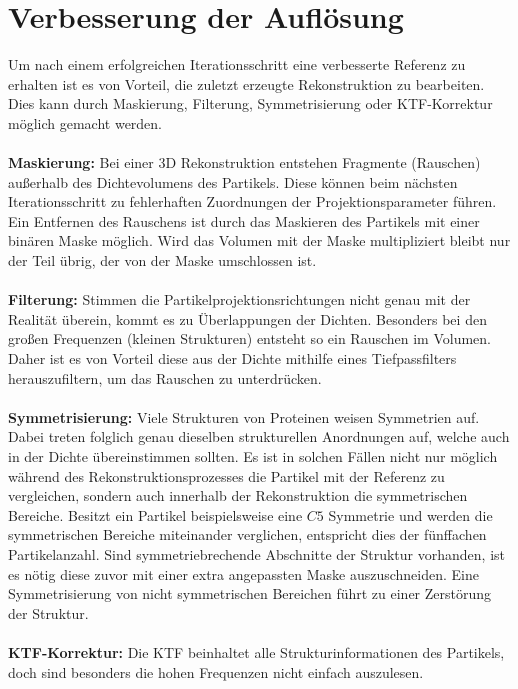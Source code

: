 \section{Verbesserung der Auflösung} %
\label{sec:verbesserung_der_aufloesung}

Um nach einem erfolgreichen Iterationsschritt eine verbesserte Referenz zu erhalten ist es von Vorteil, die zuletzt erzeugte Rekonstruktion zu bearbeiten.
Dies kann durch Maskierung, Filterung, Symmetrisierung oder KTF-Korrektur möglich gemacht werden.
\\
\\
\textbf{Maskierung:} Bei einer 3D Rekonstruktion entstehen Fragmente (Rauschen) außerhalb des Dichtevolumens des Partikels. 
Diese können beim nächsten Iterationsschritt zu fehlerhaften Zuordnungen der Projektionsparameter führen.
Ein Entfernen des Rauschens ist durch das Maskieren des Partikels mit einer binären Maske möglich.
Wird das Volumen mit der Maske multipliziert bleibt nur der Teil übrig, der von der Maske umschlossen ist.
\\
\\
\textbf{Filterung:} Stimmen die Partikelprojektionsrichtungen nicht genau mit der Realität überein, kommt es zu Überlappungen der Dichten.
Besonders bei den großen Frequenzen (kleinen Strukturen) entsteht so ein Rauschen im Volumen.
Daher ist es von Vorteil diese aus der Dichte mithilfe eines Tiefpassfilters herauszufiltern, um das Rauschen zu unterdrücken.
\\
\\
\textbf{Symmetrisierung:} Viele Strukturen von Proteinen weisen Symmetrien auf.
Dabei treten folglich genau dieselben strukturellen Anordnungen auf, welche auch in der Dichte übereinstimmen sollten.
Es ist in solchen Fällen nicht nur möglich während des Rekonstruktionsprozesses die Partikel mit der Referenz zu vergleichen, sondern auch innerhalb der Rekonstruktion die symmetrischen Bereiche. 
Besitzt ein Partikel beispielsweise eine $C5$ Symmetrie und werden die symmetrischen Bereiche miteinander verglichen, entspricht dies der fünffachen Partikelanzahl.
Sind symmetriebrechende Abschnitte der Struktur vorhanden, ist es nötig diese zuvor mit einer extra angepassten Maske auszuschneiden.
Eine Symmetrisierung von nicht symmetrischen Bereichen führt zu einer Zerstörung der Struktur.
\\
\\
\textbf{KTF-Korrektur:} Die KTF beinhaltet alle Strukturinformationen des Partikels, doch sind besonders die hohen Frequenzen nicht einfach auszulesen.
